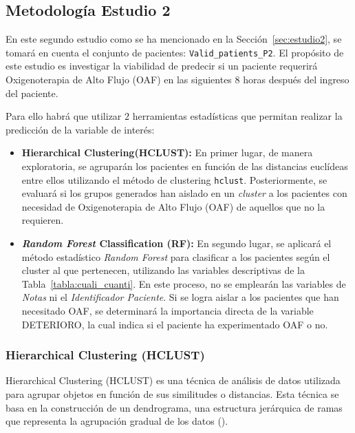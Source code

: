 \subsection{Metodología Estudio 2}\label{sec:metodologia-estudio-2}

En este segundo estudio como se ha mencionado en la Sección~\ref{sec:estudio2}, se tomará en cuenta el conjunto de pacientes: \texttt{Valid\_patients\_P2}. El propósito de este estudio es investigar la viabilidad de predecir si un paciente requerirá Oxigenoterapia de Alto Flujo (OAF) en las siguientes $8$ horas después del ingreso del paciente.

Para ello habrá que utilizar $2$ herramientas estadísticas que permitan realizar la predicción de la variable de interés:

\begin{itemize}
    \item \textbf{Hierarchical Clustering(HCLUST):} En primer lugar, de manera exploratoria, se agruparán los pacientes en función de las distancias euclídeas entre ellos utilizando el método de clustering \texttt{hclust}. Posteriormente, se evaluará si los grupos generados han aislado en un \textit{cluster} a los pacientes con necesidad de Oxigenoterapia de Alto Flujo (OAF) de aquellos que no la requieren.
    \item \textbf{\textit{Random Forest} Classification (RF):} En segundo lugar, se aplicará el método estadístico \textit{Random Forest} para clasificar a los pacientes según el cluster al que pertenecen, utilizando las variables descriptivas de la Tabla~\ref{tabla:cuali_cuanti}. En este proceso, no se emplearán las variables de \textit{Notas} ni el \textit{Identificador Paciente}. Si se logra aislar a los pacientes que han necesitado OAF, se determinará la importancia directa de la variable DETERIORO, la cual indica si el paciente ha experimentado OAF o no.
\end{itemize}

\subsubsection{Hierarchical Clustering (HCLUST)}\label{sec:hclust}

Hierarchical Clustering (HCLUST) es una técnica de análisis de datos utilizada para agrupar objetos en función de sus similitudes o distancias. Esta técnica se basa en la construcción de un dendrograma, una estructura jerárquica de ramas que representa la agrupación gradual de los datos (\cite{jain1988algorithms}).

